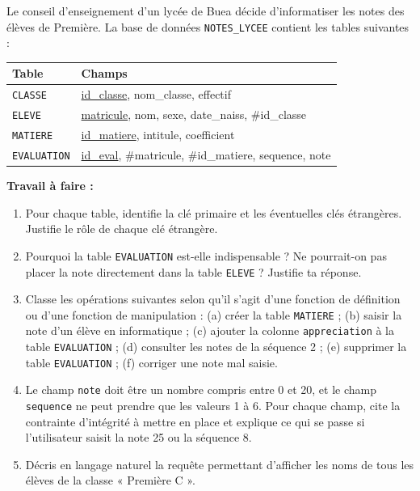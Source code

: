 \documentclass[11pt]{article}
\begin{document}
\begin{exercice}
Le conseil d'enseignement d'un lycée de Buea décide d'informatiser les notes des élèves de Première. La base de données \texttt{NOTES\_LYCEE} contient les tables suivantes :

\begin{center}
\begin{tabularx}{\linewidth}{|l|X|}
\hline
\rowcolor{popblueL} \textbf{Table} & \textbf{Champs} \\
\hline
\texttt{CLASSE} & \underline{id\_classe}, nom\_classe, effectif \\
\hline
\texttt{ELEVE} & \underline{matricule}, nom, sexe, date\_naiss, \#id\_classe \\
\hline
\texttt{MATIERE} & \underline{id\_matiere}, intitule, coefficient \\
\hline
\texttt{EVALUATION} & \underline{id\_eval}, \#matricule, \#id\_matiere, sequence, note \\
\hline
\end{tabularx}
\end{center}

\textbf{Travail à faire :}
\begin{enumerate}
\item Pour chaque table, identifie la clé primaire et les éventuelles clés étrangères. Justifie le rôle de chaque clé étrangère.
\item Pourquoi la table \texttt{EVALUATION} est-elle indispensable ? Ne pourrait-on pas placer la note directement dans la table \texttt{ELEVE} ? Justifie ta réponse.
\item Classe les opérations suivantes selon qu'il s'agit d'une fonction de définition ou d'une fonction de manipulation : (a) créer la table \texttt{MATIERE} ; (b) saisir la note d'un élève en informatique ; (c) ajouter la colonne \texttt{appreciation} à la table \texttt{EVALUATION} ; (d) consulter les notes de la séquence 2 ; (e) supprimer la table \texttt{EVALUATION} ; (f) corriger une note mal saisie.
\item Le champ \texttt{note} doit être un nombre compris entre 0 et 20, et le champ \texttt{sequence} ne peut prendre que les valeurs 1 à 6. Pour chaque champ, cite la contrainte d'intégrité à mettre en place et explique ce qui se passe si l'utilisateur saisit la note 25 ou la séquence 8.
\item Décris en langage naturel la requête permettant d'afficher les noms de tous les élèves de la classe « Première C ».
\end{enumerate}
\end{exercice}
\end{document}
